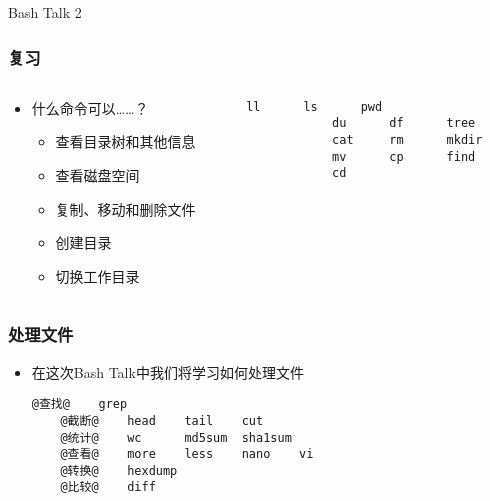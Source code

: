 



\PreFirstFrame
\begin{frame} [fragile]
	\centerline{\fontsize{42}{42}\selectfont Bash Talk 2}
\end{frame}
\PostFirstFrame

\begin{frame} [fragile]
	\frametitle{复习}
	\linespread{1.5}
	\begin{columns}[T]
		\begin{column}[T]{.5\textwidth}
			\begin{itemize}
			\item 什么命令可以……？
				\begin{itemize}
				\item 查看目录树和其他信息
				\item 查看磁盘空间
				\item 复制、移动和删除文件
				\item 创建目录
				\item 切换工作目录
				\end{itemize}
			\end{itemize}
		\end{column}
		\begin{column}[T]{.5\textwidth}
			\begin{lstlisting}[style=bashstyle, gobble=12, texcl]
			ll		ls		pwd
			du		df		tree
			cat		rm		mkdir
			mv		cp		find
			cd
			\end{lstlisting}
		\end{column}
	\end{columns}
\end{frame}

\begin{frame} [fragile]
	\frametitle{处理文件}
	\linespread{1.5}
	\begin{itemize}
	\item 在这次Bash Talk中我们将学习如何处理文件
	\begin{lstlisting}[style=bashstyle, gobble=4, texcl, escapechar=@]
	@查找@	grep
	@截断@	head	tail	cut
	@统计@	wc		md5sum	sha1sum
	@查看@	more	less	nano	vi
	@转换@	hexdump
	@比较@	diff
	\end{lstlisting}
	\end{itemize}
\end{frame}

